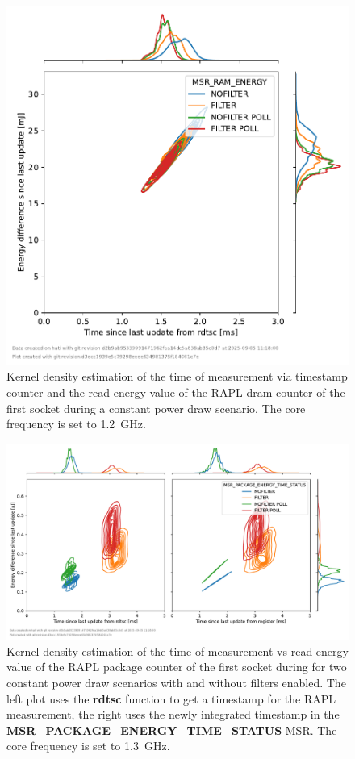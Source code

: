\begin{figure}[]
    \centering
    \includegraphics[width=0.54\columnwidth]{fig/rapl-update-intervals/MSR_RAM_ENERGY_1200000.pdf}
    \caption{Kernel density estimation of the time of measurement via timestamp counter and the read energy value of the RAPL dram counter of the first socket during a constant power draw scenario.
    The core frequency is set to \SI{1.2}{\GHz}.}
\end{figure}

\clearpage
\begin{figure}[]
    \centering
    \includegraphics[width=\columnwidth]{fig/rapl-update-intervals/MSR_PACKAGE_ENERGY_TIME_STATUS_1300000.pdf}
    \caption{Kernel density estimation of the time of measurement vs read energy value of the RAPL package counter of the first socket during for two constant power draw scenarios with and without filters enabled.
    The left plot uses the \textbf{rdtsc} function to get a timestamp for the RAPL measurement, the right uses the newly integrated timestamp in the \textbf{MSR\_PACKAGE\_ENERGY\_TIME\_STATUS} MSR.
    The core frequency is set to \SI{1.3}{\GHz}.}
\end{figure}

